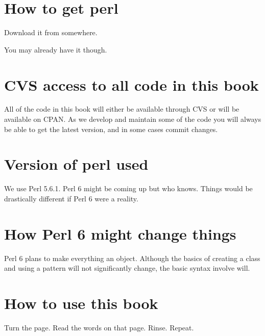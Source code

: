 
    \section{How to get perl}
Download it from somewhere.  

You may already have it though.
    \section{CVS access to all code in this book}
All of the code in this book will either be available through CVS
or will be available on CPAN.  As we develop and maintain some of the 
code you will always be able to get the latest version, and in some cases
commit changes.
    \section{Version of perl used}
We use Perl 5.6.1.  Perl 6 might be coming up but who knows.  Things
would be drastically different if Perl 6 were a reality.
    \section{How Perl 6 might change things}
Perl 6 plans to make everything an object.  Although the basics of
creating a class and using a pattern will not significantly change,
the basic syntax involve will.
    \section{How to use this book}
Turn the page.  Read the words on that page.  Rinse. Repeat.
